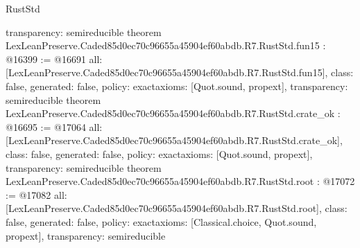 \begin{lexlean}{RustStd}
\begin{coremodule}
{  transparency: semireducible
}
theorem LexLeanPreserve.Caded85d0ec70c96655a45904ef60abdb.R7.RustStd.fun15 : @16399 := @16691 {
  all: [LexLeanPreserve.Caded85d0ec70c96655a45904ef60abdb.R7.RustStd.fun15],
  class: false,
  generated: false,
  policy: exact{axioms: [Quot.sound, propext]},
  transparency: semireducible
}
theorem LexLeanPreserve.Caded85d0ec70c96655a45904ef60abdb.R7.RustStd.crate_ok : @16695 := @17064 {
  all: [LexLeanPreserve.Caded85d0ec70c96655a45904ef60abdb.R7.RustStd.crate_ok],
  class: false,
  generated: false,
  policy: exact{axioms: [Quot.sound, propext]},
  transparency: semireducible
}
theorem LexLeanPreserve.Caded85d0ec70c96655a45904ef60abdb.R7.RustStd.root : @17072 := @17082 {
  all: [LexLeanPreserve.Caded85d0ec70c96655a45904ef60abdb.R7.RustStd.root],
  class: false,
  generated: false,
  policy: exact{axioms: [Classical.choice, Quot.sound, propext]},
  transparency: semireducible
}


\end{coremodule}
\end{lexlean}

